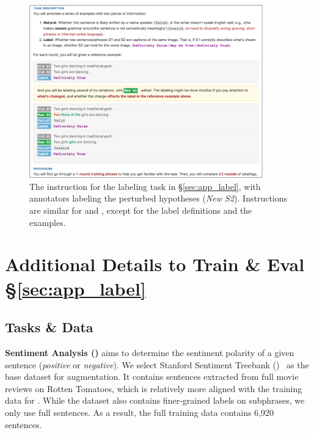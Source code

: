 \begin{figure}
\centering
\includegraphics[width=0.9\textwidth]{figures/mturk_instruction.pdf}
\vspace{-1pt}
\caption{
The instruction for the \nli labeling task in \S\ref{sec:app_label}, with annotators labeling the perturbed hypotheses (\emph{New S2}). 
Instructions are similar for \qqp and \sst, except for the label definitions and the examples.
}
\vspace{-10pt}
\label{fig:mturk_instruction}

\end{figure}




\section{Additional Details to Train \& Eval \S\ref{sec:app_label}}
\label{appendix:app_label}

\subsection{Tasks \& Data}
\label{appendix:app_label_data}

\textbf{Sentiment Analysis (\sst)} aims to determine the sentiment polarity of a given sentence (\emph{positive} or \emph{negative}). 
We select Stanford Sentiment Treebank (\dsst)~\cite{socher2013recursive} as the base dataset for augmentation.
It contains sentences extracted from full movie reviews on Rotten Tomatoes, which is relatively more aligned with the training data for \sysname. 
While the dataset also contains finer-grained labels on subphrases, we only use full sentences.
As a result, the full training data contains 6,920 sentences.

